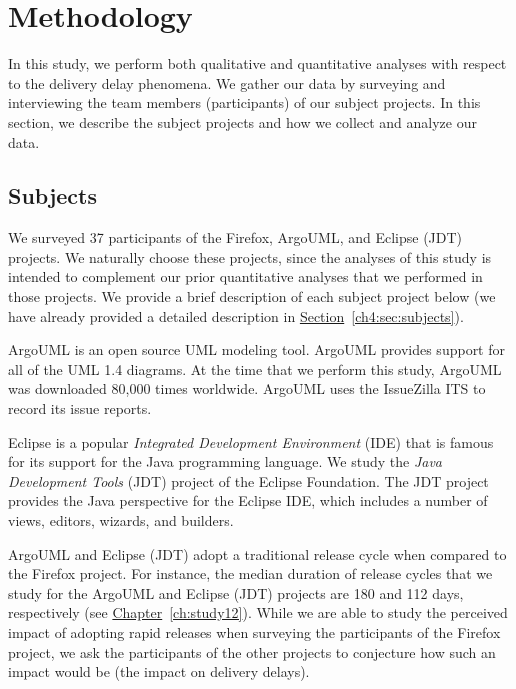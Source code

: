 \section{Methodology} \label{ch6:studysettings}

In this study, we perform both qualitative and quantitative analyses with
respect to the delivery delay phenomena. We gather our data by surveying and
interviewing the team members (\ie participants) of our subject projects. In
this section, we describe the subject projects and how we collect and analyze
our data.

\subsection{Subjects}

We surveyed 37 participants of the Firefox, ArgoUML, and Eclipse (JDT) projects.
We naturally choose these projects, since the analyses of this study is intended
to complement our prior quantitative analyses that we performed in those
projects.  We provide a brief description of each subject project below (we have
already provided a detailed description in
\hyperref[ch4:sec:subjects]{Section}~\ref{ch4:sec:subjects}).

ArgoUML is an open source UML modeling tool. ArgoUML provides support for all of
the UML 1.4 diagrams. At the time that we perform this study, ArgoUML was
downloaded 80,000 times worldwide.
ArgoUML uses the IssueZilla ITS to record its issue
reports.

Eclipse is a popular {\em Integrated Development Environment} (IDE) that is
famous for its support for the Java programming
language. We study the {\em Java
Development Tools} (JDT) project of the Eclipse
Foundation.
The JDT project provides the Java perspective for the Eclipse IDE, which
includes a number of views, editors, wizards, and builders. 

ArgoUML and Eclipse (JDT) adopt a traditional release cycle when compared to the
Firefox project. For instance, the median duration of release cycles that we
study for the ArgoUML and Eclipse (JDT) projects are 180 and 112 days,
respectively (see \hyperref[ch:study12]{Chapter}~\ref{ch:study12}). While we are
able to study the perceived impact of adopting rapid releases when surveying the
participants of the Firefox project, we ask the participants of the other
projects to conjecture how such an impact would be (\ie the impact on delivery
delays). 

